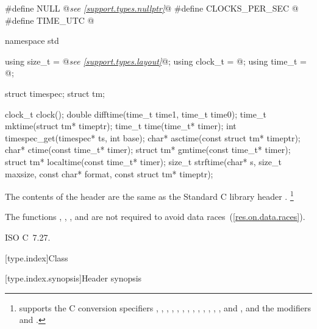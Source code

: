 %
%
%
%
%
%
%
%
%
%
%
%
%
%
%
%
%
%
%
\begin{codeblock}
#define NULL @\textit{see \ref{support.types.nullptr}}@
#define CLOCKS_PER_SEC @\seebelow@
#define TIME_UTC @\seebelow@

namespace std {
  using size_t = @\textit{see \ref{support.types.layout}}@;
  using clock_t = @\seebelow@;
  using time_t = @\seebelow@;

  struct timespec;
  struct tm;

  clock_t clock();
  double difftime(time_t time1, time_t time0);
  time_t mktime(struct tm* timeptr);
  time_t time(time_t* timer);
  int timespec_get(timespec* ts, int base);
  char* asctime(const struct tm* timeptr);
  char* ctime(const time_t* timer);
  struct tm* gmtime(const time_t* timer);
  struct tm* localtime(const time_t* timer);
  size_t strftime(char* s, size_t maxsize, const char* format, const struct tm* timeptr);
}
\end{codeblock}

\pnum
{}%
%
The contents of the header  are the same as the Standard C library header .%
\footnote{ supports the C conversion specifiers
, , , , , , ,
, , , , , , and
, and the modifiers  and .}

\pnum
The functions , , , and
 are not required to avoid data
races~(\ref{res.on.data.races}).

\xref ISO C~7.27.

[type.index]{Class }

%
[type.index.synopsis]{Header  synopsis}

